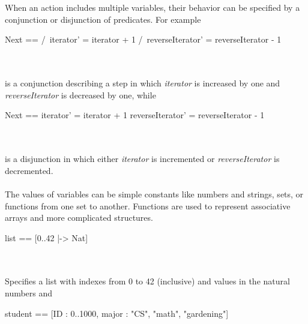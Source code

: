 \documentclass{uit-thesis}
\begin{document}
\\\\
When an action includes multiple variables, their behavior can be specified by a conjunction or disjunction of predicates. For example
\begin{tla}
    Next ==
        /\ iterator' = iterator + 1
        /\ reverseIterator' = reverseIterator - 1
\end{tla}
\begin{tlatex}
%
%
%
\end{tlatex}
\\\\
is a conjunction describing a step in which \textit{iterator} is increased by one and \textit{reverseIterator} is decreased by one, while
\begin{tla}
    Next ==
        \/ iterator' = iterator + 1
        \/ reverseIterator' = reverseIterator - 1
\end{tla}
\begin{tlatex}
%
%
%
\end{tlatex}
\\\\
is a disjunction in which either \textit{iterator} is incremented or \textit{reverseIterator} is decremented.
\\\\
The values of variables can be simple constants like numbers and strings, sets, or functions from one set to another. Functions are used to represent associative arrays and more complicated structures.
\begin{tla}
    list == [0..42 |-> Nat]
\end{tla}
\begin{tlatex}
%
\end{tlatex}
\\\\
Specifies a list with indexes from 0 to 42 (inclusive) and values in the natural numbers and
\begin{tla}
    student == [ID : 0..1000, major : {"CS", "math", "gardening"}]
\end{tla}
\begin{tlatex}
\end{tlatex}
\end{document}

